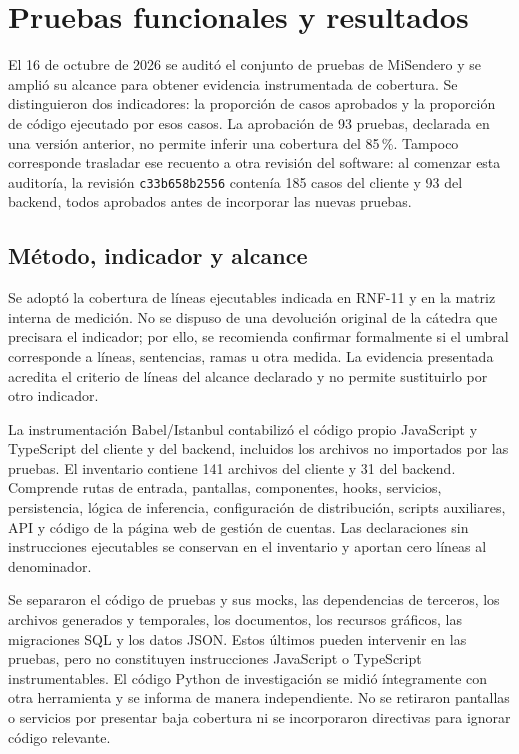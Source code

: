 \section{Pruebas funcionales y resultados}\label{sec:pruebas-funcionales}

El 16 de octubre de 2026 se auditó el conjunto de pruebas de MiSendero y se amplió su alcance para obtener evidencia instrumentada de cobertura. Se distinguieron dos indicadores: la proporción de casos aprobados y la proporción de código ejecutado por esos casos. La aprobación de 93 pruebas, declarada en una versión anterior, no permite inferir una cobertura del 85\,\%. Tampoco corresponde trasladar ese recuento a otra revisión del software: al comenzar esta auditoría, la revisión \texttt{c33b658b2556} contenía 185 casos del cliente y 93 del backend, todos aprobados antes de incorporar las nuevas pruebas.

\subsection{Método, indicador y alcance}

Se adoptó la cobertura de líneas ejecutables indicada en RNF-11 y en la matriz interna de medición. No se dispuso de una devolución original de la cátedra que precisara el indicador; por ello, se recomienda confirmar formalmente si el umbral corresponde a líneas, sentencias, ramas u otra medida. La evidencia presentada acredita el criterio de líneas del alcance declarado y no permite sustituirlo por otro indicador.

La instrumentación Babel/Istanbul contabilizó el código propio JavaScript y TypeScript del cliente y del backend, incluidos los archivos no importados por las pruebas. El inventario contiene 141 archivos del cliente y 31 del backend. Comprende rutas de entrada, pantallas, componentes, hooks, servicios, persistencia, lógica de inferencia, configuración de distribución, scripts auxiliares, API y código de la página web de gestión de cuentas. Las declaraciones sin instrucciones ejecutables se conservan en el inventario y aportan cero líneas al denominador.

Se separaron el código de pruebas y sus mocks, las dependencias de terceros, los archivos generados y temporales, los documentos, los recursos gráficos, las migraciones SQL y los datos JSON. Estos últimos pueden intervenir en las pruebas, pero no constituyen instrucciones JavaScript o TypeScript instrumentables. El código Python de investigación se midió íntegramente con otra herramienta y se informa de manera independiente. No se retiraron pantallas o servicios por presentar baja cobertura ni se incorporaron directivas para ignorar código relevante.

